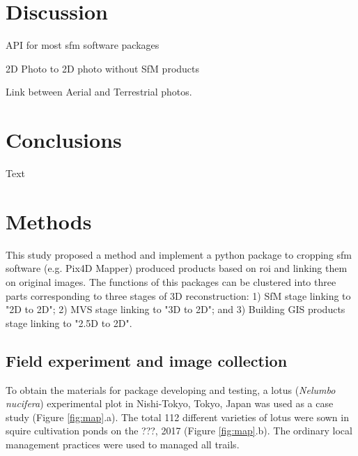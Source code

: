 \documentclass{configs/bmcart}
\begin{document}
\section*{Discussion}

API for most \acrshort*{sfm} software packages

2D Photo to 2D photo without SfM products

Link between Aerial and Terrestrial photos.

\section*{Conclusions}
Text

\section*{Methods}

This study proposed a method and implement a python package to cropping \acrshort*{sfm} software (e.g. Pix4D Mapper) produced products based on \acrfull*{roi} and linking them on original images. The functions of this packages can be clustered into three parts corresponding to three stages of 3D reconstruction: 1) SfM stage linking to "2D to 2D"; 2) MVS stage linking to "3D to 2D"; and 3) Building GIS products stage linking to "2.5D to 2D".

\subsection*{Field experiment and image collection}

To obtain the materials for package developing and testing, a lotus (\textit{Nelumbo nucifera}) experimental plot in Nishi-Tokyo, Tokyo, Japan was used as a case study (Figure \ref{fig:map}.a). The total 112 different varieties of lotus were sown in squire cultivation ponds on the ???, 2017 (Figure \ref{fig:map}.b). The ordinary local management practices were used to managed all trails.
\end{document}
